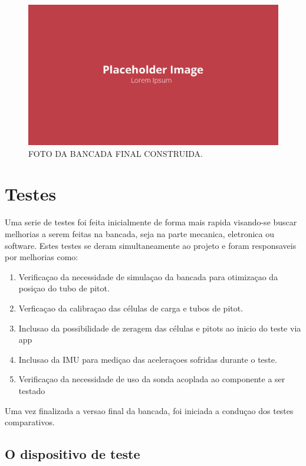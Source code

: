\begin{figure}[!ht]
    \centering
    \includegraphics[width=.8\linewidth]{figuras/placeholder.png}
    \caption{FOTO DA BANCADA FINAL CONSTRUIDA\cite{autor}.}
    \label{fig:placeholder}
\end{figure}

\section{Testes}

Uma serie de testes foi feita inicialmente de forma mais rapida visando-se buscar melhorias a serem feitas na bancada, seja na parte mecanica, eletronica ou software. Estes testes se deram simultaneamente ao projeto e foram responsaveis por melhorias como:

\begin{enumerate}
    \item Verificaçao da necessidade de simulaçao da bancada para otimizaçao da posiçao do tubo de pitot.
    \item Verficaçao da calibraçao das células de carga e tubos de pitot.
    \item Inclusao da possibilidade de zeragem das células e pitots ao inicio do teste via app
    \item Inclusao da IMU para mediçao das aceleraçoes sofridas durante o teste.
    \item Verificaçao da necessidade de uso da sonda acoplada ao componente a ser testado
\end{enumerate}

Uma vez finalizada a versao final da bancada, foi iniciada a conduçao dos testes comparativos.

\subsection{O dispositivo de teste}

